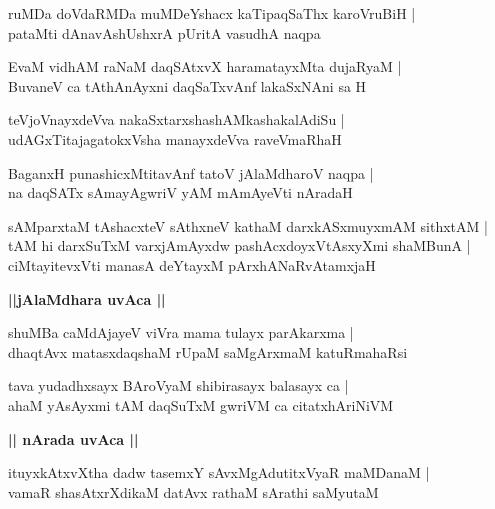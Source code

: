 \documentclass[twoside,12pt,openright]{book}
\newcounter{shloka}[chapter]
\def\uvaca#1{\centerline{{\large\textbf{#1}}}}
\begin{document}
\begin{shloka}%
ruMDa doVdaRMDa muMDeYshacx kaTipaqSaThx karoVruBiH |\\
pataMti dAnavAshUshxrA pUritA vasudhA naqpa
\end{shloka}

\begin{shloka}%
EvaM vidhAM raNaM daqSAtxvX haramatayxMta dujaRyaM |\\
BuvaneV ca tAthAnAyxni daqSaTxvAnf lakaSxNAni sa H 
\end{shloka}

\begin{shloka}%
teVjoVnayxdeVva nakaSxtarxshashAMkashakalAdiSu |\\
udAGxTitajagatokxVsha manayxdeVva raveVmaRhaH 
\end{shloka}

\begin{shloka}%
BaganxH punashicxMtitavAnf tatoV jAlaMdharoV naqpa |\\
na daqSATx sAmayAgwriV yAM mAmAyeVti nAradaH 
\end{shloka}

\begin{shloka}%
sAMparxtaM tAshacxteV sAthxneV kathaM darxkASxmuyxmAM sithxtAM |\\
tAM hi darxSuTxM varxjAmAyxdw pashAcxdoyxVtAsxyXmi shaMBunA |\\
ciMtayitevxVti manasA deYtayxM pArxhANaRvAtamxjaH
\end{shloka}

\uvaca{||jAlaMdhara uvAca ||}

\begin{shloka}%
shuMBa caMdAjayeV viVra mama tulayx parAkarxma |\\
dhaqtAvx matasxdaqshaM rUpaM saMgArxmaM katuRmahaRsi
\end{shloka}

\begin{shloka}%
tava yudadhxsayx BAroVyaM shibirasayx balasayx ca |\\
ahaM yAsAyxmi tAM daqSuTxM gwriVM ca citatxhAriNiVM 
\end{shloka}

\uvaca{|| nArada uvAca ||}

\begin{shloka}%
ituyxkAtxvXtha dadw tasemxY sAvxMgAdutitxVyaR maMDanaM |\\
vamaR shasAtxrXdikaM datAvx rathaM sArathi saMyutaM 
\end{shloka}
\end{document}
